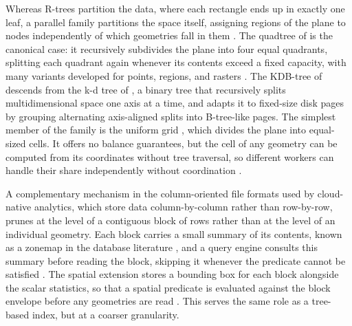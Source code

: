 Whereas R-trees partition the data, where each rectangle ends up in exactly one leaf, a parallel family partitions the space itself, assigning regions of the plane to nodes independently of which geometries fall in them \parencite{gaede1998_multidimensional_access_methods}. The quadtree of \textcite{finkel1974_quad_trees_composite_keys} is the canonical case: it recursively subdivides the plane into four equal quadrants, splitting each quadrant again whenever its contents exceed a fixed capacity, with many variants developed for points, regions, and rasters \parencite{samet1984_quadtree_hierarchical_data_structures}. The KDB-tree of \textcite{robinson1981_kdb_tree_search_structure} descends from the k-d tree of \textcite{bentley1975_multidimensional_binary_search_trees}, a binary tree that recursively splits multidimensional space one axis at a time, and adapts it to fixed-size disk pages by grouping alternating axis-aligned splits into B-tree-like pages. The simplest member of the family is the uniform grid \parencite{gaede1998_multidimensional_access_methods}, which divides the plane into equal-sized cells. It offers no balance guarantees, but the cell of any geometry can be computed from its coordinates without tree traversal, so different workers can handle their share independently without coordination \parencite{yu2019_geospark_perspective_beyond}.

A complementary mechanism in the column-oriented file formats used by cloud-native analytics, which store data column-by-column rather than row-by-row, prunes at the level of a contiguous block of rows rather than at the level of an individual geometry. Each block carries a small summary of its contents, known as a zonemap in the database literature \parencite{moerkotte1998_small_materialized_aggregates}, and a query engine consults this summary before reading the block, skipping it whenever the predicate cannot be satisfied \parencite{lamb2022_querying_parquet_millisecond_latency}. The spatial extension stores a bounding box for each block alongside the scalar statistics, so that a spatial predicate is evaluated against the block envelope before any geometries are read \parencite{ogc2024_geoparquet_specification_v110}. This serves the same role as a tree-based index, but at a coarser granularity.